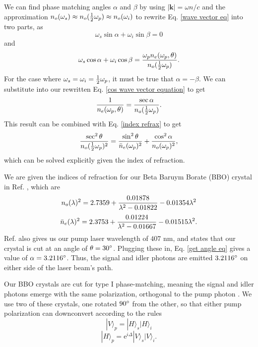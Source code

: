 \documentclass[11pt,letterpaper]{article}
\begin{document}
We can find phase matching angles $\alpha$ and $\beta$ by using $|\textbf{k}| = \omega n / c$ and the approximation $n_o(\omega_s) \approx n_o({1 \over 2} \omega_p) \approx n_o(\omega_i)$ to rewrite Eq. \ref{wave vector eq} into two parts, as 
\begin{equation}
    \omega_s \sin \alpha + \omega_i \sin \beta = 0
\end{equation}
and
\begin{equation}
    \omega_s \cos \alpha + \omega_i \cos \beta = {\omega_p n_e(\omega_p,\theta) \over n_o({1 \over 2} \omega_p)} . \label{cos wave vector equation}
\end{equation}
For the case where $\omega_s = \omega_i = {1 \over 2}\omega_p$, it must be true that $\alpha = -\beta$. We can substitute into our rewritten Eq. \ref{cos wave vector equation} to get
\begin{equation}
    {1 \over n_e(\omega_p,\theta)} = {\sec \alpha \over n_o({1 \over 2} \omega_p)} .
\end{equation}
This result can be combined with Eq. \ref{index refrax} to get
\begin{equation}
    {\sec^2 \theta \over n_o({1 \over 2}\omega_p)^2} = {\sin^2 \theta \over \Bar{n}_e(\omega_p)^2} + {\cos^2 \alpha \over n_o(\omega_p)^2} , \label{get angle eq}
\end{equation}
which can be solved explicitly given the index of refraction.

We are given the indices of refraction for our Beta Baruym Borate (BBO) crystal in Ref. \cite{Lab manual}, which are
\begin{equation}
    n_o(\lambda)^2 = 2.7359 + {0.01878 \over \lambda^2 - 0.01822} - 0.01354\lambda^2
\end{equation}
\begin{equation}
    \Bar{n}_e(\lambda)^2 = 2.3753 + {0.01224 \over \lambda^2 - 0.01667} - 0.01515\lambda^2 .
\end{equation}
Ref. \cite{Lab manual} also gives us our pump laser wavelength of $407$ nm, and states that our crystal is cut at an angle of $\theta = 30 \degree$. Plugging these in, Eq. \ref{get angle eq} gives a value of $\alpha = 3.2116 \degree$. Thus, the signal and idler photons are emitted $3.2116 \degree$ on either side of the laser beam's path.

Our BBO crystals are cut for type I phase-matching, meaning the signal and idler photons emerge with the same polarization, orthogonal to the pump photon \cite{Dehlinger}. We use two of these crystals, one rotated $90\degree$ from the other, so that either pump polarization can downconvert according to the rules
\begin{equation}
    |V\rangle_p = |H\rangle_s|H\rangle_i
\end{equation}
\begin{equation}
    |H\rangle_p = \mathrm{e}^{i\Delta} |V\rangle_s |V\rangle_i .
\end{equation}
\end{document}
